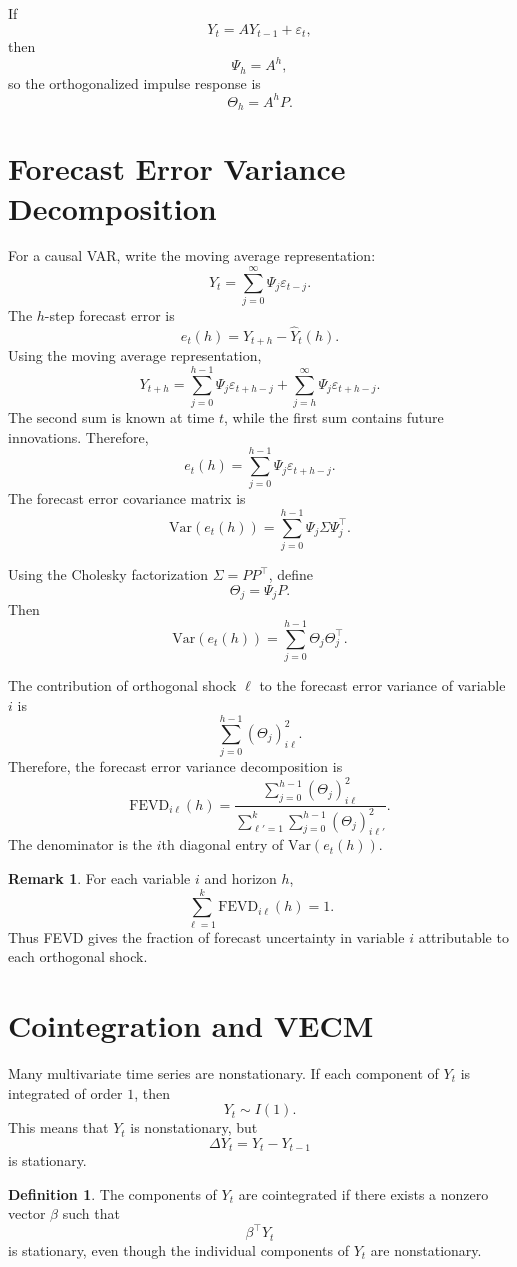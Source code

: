 \documentclass[12pt,oneside]{book}
\numberwithin{equation}{section}
\theoremstyle{definition}
\newtheorem{definition}{Definition}[section]
\newtheorem{remark}{Remark}[section]
\theoremstyle{plain}
\theoremstyle{remark}
\newcommand{\Var}{\mathrm{Var}}
\begin{document}
If
\[
Y_t=AY_{t-1}+\varepsilon_t,
\]
then
\[
\Psi_h=A^h,
\]
so the orthogonalized impulse response is
\[
\Theta_h=A^hP.
\]

\section{Forecast Error Variance Decomposition}

For a causal VAR, write the moving average representation:
\[
Y_t=\sum_{j=0}^{\infty}\Psi_j\varepsilon_{t-j}.
\]
The $h$-step forecast error is
\[
e_t(h)=Y_{t+h}-\widehat{Y}_t(h).
\]
Using the moving average representation,
\[
Y_{t+h}
=
\sum_{j=0}^{h-1}\Psi_j\varepsilon_{t+h-j}
+
\sum_{j=h}^{\infty}\Psi_j\varepsilon_{t+h-j}.
\]
The second sum is known at time $t$, while the first sum contains future innovations. Therefore,
\[
e_t(h)
=
\sum_{j=0}^{h-1}\Psi_j\varepsilon_{t+h-j}.
\]
The forecast error covariance matrix is
\[
\Var(e_t(h))
=
\sum_{j=0}^{h-1}
\Psi_j\Sigma\Psi_j^\top.
\]

Using the Cholesky factorization $\Sigma=PP^\top$, define
\[
\Theta_j=\Psi_jP.
\]
Then
\[
\Var(e_t(h))
=
\sum_{j=0}^{h-1}
\Theta_j\Theta_j^\top.
\]

The contribution of orthogonal shock $\ell$ to the forecast error variance of variable $i$ is
\[
\sum_{j=0}^{h-1}
\left(\Theta_j\right)_{i\ell}^2.
\]
Therefore, the forecast error variance decomposition is
\[
\mathrm{FEVD}_{i\ell}(h)
=
\frac{
\sum_{j=0}^{h-1}
\left(\Theta_j\right)_{i\ell}^2
}{
\sum_{\ell'=1}^{k}
\sum_{j=0}^{h-1}
\left(\Theta_j\right)_{i\ell'}^2
}.
\]
The denominator is the $i$th diagonal entry of $\Var(e_t(h))$.

\begin{remark}
For each variable $i$ and horizon $h$,
\[
\sum_{\ell=1}^k \mathrm{FEVD}_{i\ell}(h)=1.
\]
Thus FEVD gives the fraction of forecast uncertainty in variable $i$ attributable to each orthogonal shock.
\end{remark}

\section{Cointegration and VECM}

Many multivariate time series are nonstationary. If each component of $Y_t$ is integrated of order $1$, then
\[
Y_t\sim I(1).
\]
This means that $Y_t$ is nonstationary, but
\[
\Delta Y_t=Y_t-Y_{t-1}
\]
is stationary.

\begin{definition}
The components of $Y_t$ are cointegrated if there exists a nonzero vector $\beta$ such that
\[
\beta^\top Y_t
\]
is stationary, even though the individual components of $Y_t$ are nonstationary.
\end{definition}
\end{document}
